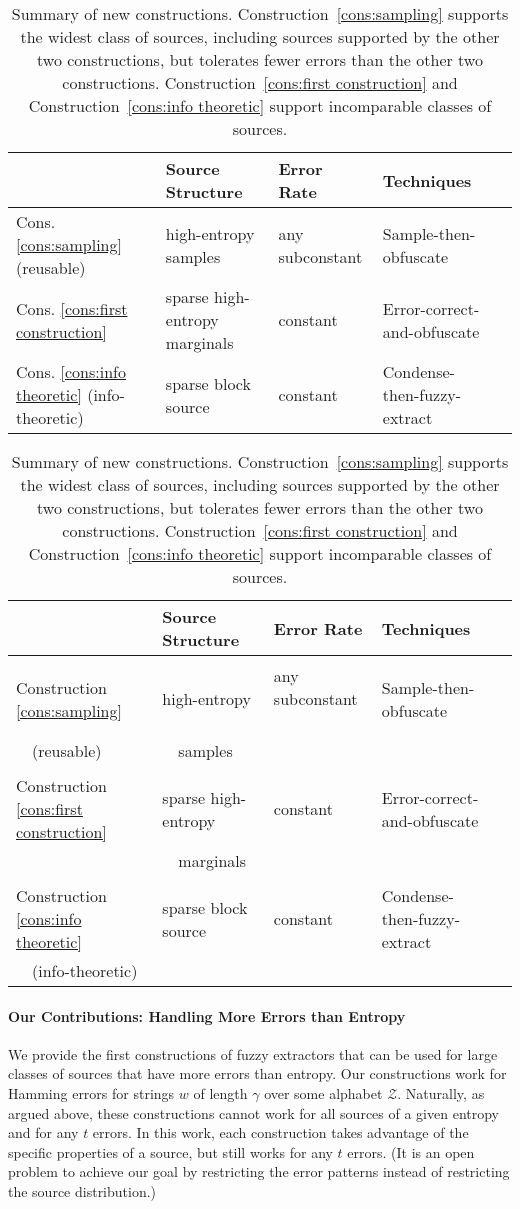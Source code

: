\documentclass[11pt]{article}
\newcommand{\consref}[1]{\mbox{Construction~\ref{#1}}}
\begin{document}
\begin{table}
\begin{center}
\ifnum{}
\begin{tabular}{l l l l l}
  & Source Structure & Error Rate  & Techniques\\
\hline
Cons. \ref{cons:sampling} (reusable)  & high-entropy samples & any subconstant &  Sample-then-obfuscate \\
Cons. \ref{cons:first construction}  & sparse high-entropy  marginals & constant &  Error-correct-and-obfuscate\\
Cons. \ref{cons:info theoretic} (info-theoretic)   & sparse block source  & constant & Condense-then-fuzzy-extract\\
\end{tabular}
\else
\begin{tabular}{l l l l l}
  & Source Structure & Error Rate  & Techniques\\
\hline \vspace{-3mm} \\
Construction \ref{cons:sampling} & high-entropy & any subconstant \ \ &  Sample-then-obfuscate \\
\ \ (reusable)& \ \ samples\\ \vspace{-3mm} \\
Construction \ref{cons:first construction}  & sparse high-entropy \ \  & constant &  Error-correct-and-obfuscate\\
& \ \ marginals\\ \vspace{-3mm} \\
Construction \ref{cons:info theoretic}   & sparse block source  & constant & Condense-then-fuzzy-extract\\
\ \ (info-theoretic)\\
\hline\end{tabular}
\fi
\end{center}
\caption{Summary of new constructions. \consref{cons:sampling} supports the widest class of sources, including sources supported by the other two constructions, but tolerates fewer errors than the other two constructions.  \consref{cons:first construction} and \consref{cons:info theoretic} support incomparable classes of sources.}
\label{tab:upper bounds}
\end{table}

\paragraph{Our Contributions: Handling More Errors than Entropy}
We provide the first constructions of fuzzy extractors that can be used for large classes of sources that have more errors than entropy.  Our constructions work for Hamming errors for strings $w$ of length $\gamma$ over some alphabet $\mathcal{Z}$. Naturally, as argued above, these constructions cannot work for all sources of a given entropy and for any $t$ errors. In this work, each construction takes advantage of the specific properties of a source, but still works for any $t$ errors. (It is an open problem to achieve our goal by restricting the error patterns instead of restricting the source distribution.)
\end{document}
